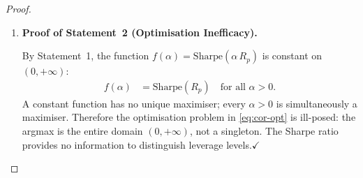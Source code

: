 \documentclass[12pt,openany]{book}
\newcommand{\E}{\mathbb{E}}
\numberwithin{equation}{chapter}
\theoremstyle{plain}
\theoremstyle{definition}
\theoremstyle{remark}
\numberwithin{equation}{chapter}
\theoremstyle{plain}
\begin{document}
\begin{proof}
\begin{enumerate}
        \noindent
        \textbf{Step~5: Reduction to the standard case.}
        We now observe that in the conventional Sharpe ratio
        formulation (which is also that of
        Definition~\ref{def:sharpe}), $R_f$ is treated as
        the \emph{unlevered} risk-free rate regardless of
        leverage applied to the risky portfolio.  That is,
        the benchmark $R_f$ does not scale with $\alpha$.
        Under this convention, the numerator of
        \eqref{eq:cor-pf-sub} simplifies to
        $\alpha\,\E[X_p]$ only when the excess return is
        defined as $\alpha(R_p - R_f)$.  Since
        Proposition~\ref{prop:sharpe-leverage} defines the
        levered excess return as $X'_p = \alpha\,X_p$
        (i.e., the leverage is applied to the full excess
        return, not merely the gross return), we have:
        \begin{align}
          \E[X'_p]
            &= \alpha\,\E[X_p],
          \label{eq:cor-pf-mean3} \\
          \sigma'_p
            &= \alpha\,\sigma_p,
          \label{eq:cor-pf-std3}
        \end{align}
        exactly as established in \eqref{eq:sharpe-pf-mean}
        and \eqref{eq:sharpe-pf-std} of
        Proposition~\ref{prop:sharpe-leverage}.

        \noindent
        \textbf{Step~6: Cancellation and conclusion.}
        Substituting \eqref{eq:cor-pf-mean3} and
        \eqref{eq:cor-pf-std3}:
        \begin{align}
          \mathrm{Sharpe}(\alpha\,R_p)
            &= \frac{\alpha\,\E[X_p]}
                    {\alpha\,\sigma_p}
               \cdot\sqrt{T}
          \label{eq:cor-cancel} \\
            &= \frac{\E[X_p]}{\sigma_p}
               \cdot\sqrt{T}
          \label{eq:cor-cancel2} \\
            &= \mathrm{Sharpe}(R_p).
          \label{eq:cor-inv2}
        \end{align}
        The step from \eqref{eq:cor-cancel} to
        \eqref{eq:cor-cancel2} is valid because $\alpha > 0$
        implies $\alpha \neq 0$, so division by $\alpha$ is
        permissible.  This establishes
        \eqref{eq:cor-inv}.\hfill$\checkmark$

  \item \textbf{Proof of Statement~2 (Optimisation
        Inefficacy).}

        \noindent
        By Statement~1, the function
        $f(\alpha) = \mathrm{Sharpe}(\alpha\,R_p)$ is
        constant on $(0,+\infty)$:
        \begin{align}
          f(\alpha)
            &= \mathrm{Sharpe}(R_p)
             \quad \text{for all } \alpha > 0.
          \label{eq:cor-const}
        \end{align}
        A constant function has no unique maximiser; every
        $\alpha > 0$ is simultaneously a maximiser.
        Therefore the optimisation problem in
        \eqref{eq:cor-opt} is ill-posed: the argmax is the
        entire domain $(0,+\infty)$, not a singleton.  The
        Sharpe ratio provides no information to distinguish
        leverage levels.\hfill$\checkmark$


\end{enumerate}
\end{proof}
\end{document}

